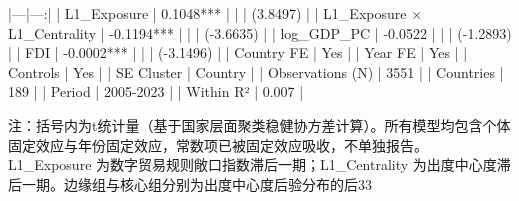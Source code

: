 |---|---:|
| L1_Exposure | 0.1048*** |
|  | (3.8497) |
| L1\_Exposure × L1\_Centrality | -0.1194*** |
|  | (-3.6635) |
| log_GDP_PC | -0.0522 |
|  | (-1.2893) |
| FDI | -0.0002*** |
|  | (-3.1496) |
| Country FE | Yes |
| Year FE | Yes |
| Controls | Yes |
| SE Cluster | Country |
| Observations (N) | 3551 |
| Countries | 189 |
| Period | 2005-2023 |
| Within R² | 0.007 |

注：括号内为t统计量（基于国家层面聚类稳健协方差计算）。所有模型均包含个体固定效应与年份固定效应，常数项已被固定效应吸收，不单独报告。
L1_Exposure 为数字贸易规则敞口指数滞后一期；L1_Centrality 为出度中心度滞后一期。边缘组与核心组分别为出度中心度后验分布的后33%